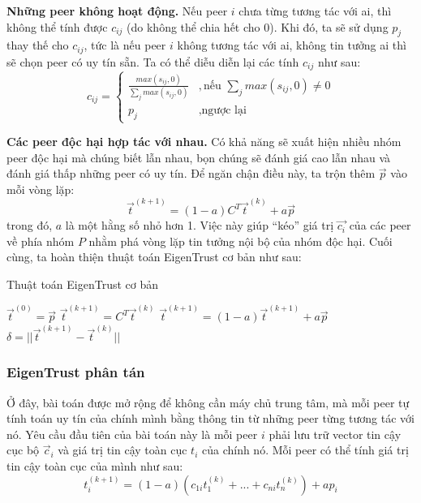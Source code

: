 \textbf{Những peer không hoạt động.} Nếu peer $i$ chưa từng tương tác với ai, thì không thể tính được $c_{ij}$ (do không thể chia hết cho 0).
Khi đó, ta sẽ sử dụng $p_j$ thay thế cho $c_{ij}$, tức là nếu peer $i$ không tương tác với ai, không tin tưởng ai thì sẽ chọn peer có uy tín sẵn.
Ta có thể diễu diễn lại các tính $c_{ij}$ như sau:
\[
  c_{ij} =
  \begin{cases}
    \frac{max(s_{ij}, 0)}{\sum_{j} max(s_{ij}, 0)} & , \text{nếu } \sum_{j} max(s_{ij}, 0) \neq 0 \\
    p_j                                            & , \text{ngược lại}
  \end{cases}
\]

\textbf{Các peer độc hại hợp tác với nhau.} Có khả năng sẽ xuất hiện nhiều nhóm peer độc hại mà chúng biết lẫn nhau, bọn chúng sẽ đánh giá cao lẫn nhau và đánh giá thấp những peer có uy tín.
Để ngăn chận điều này, ta trộn thêm $\vec{p}$ vào mỗi vòng lặp:
\[\vec{t}^{(k+1)} = (1 - a)C^{T}\vec{t}^{(k)} + a\vec{p}\]
trong đó, $a$ là một hằng số nhỏ hơn 1. Việc này giúp ``kéo'' giá trị $\vec{c_i}$ của các peer về phía nhóm $P$ nhằm phá vòng lặp tin tưởng nội bộ của nhóm độc hại. Cuối cùng, ta hoàn thiện thuật toán EigenTrust cơ bản như sau:

\begin{algorithm}
  \caption{Thuật toán EigenTrust cơ bản}
  \label{alg:basic-eigentrust-algorithm}
  \begin{algorithmic}
    \State $\vec{t}^{(0)} = \vec{p}$
    \Repeat
    \State $\vec{t}^{(k+1)} = C^{T}\vec{t}^{(k)}$
    \State $\vec{t}^{(k+1)} = (1 - a)\vec{t}^{(k+1)} + a\vec{p}$
    \State $\delta = || \vec{t}^{(k+1)} - \vec{t}^{(k)} ||$
    \Until{$\delta < \epsilon$}
  \end{algorithmic}
\end{algorithm}

\subsubsection{EigenTrust phân tán}

Ở đây, bài toán được mở rộng để không cần máy chủ trung tâm, mà mỗi peer tự tính toán uy tín của chính mình bằng thông tin từ những peer từng tương tác với nó.
Yêu cầu đầu tiên của bài toán này là mỗi peer $i$ phải lưu trữ vector tin cậy cục bộ $\vec{c}_i$ và giá trị tin cậy toàn cục $t_i$ của chính nó.
Mỗi peer có thể tính giá trị tin cậy toàn cục của mình như sau:
\[t_i^{(k+1)} = (1 - a)(c_{1i}t_1^{(k)} + ... + c_{ni}t_n^{(k)}) + ap_i\]

